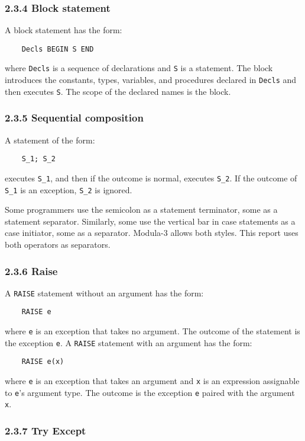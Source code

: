 \documentclass[10pt]{article}
\begin{document}
\subsubsection*{2.3.4 Block statement}

A block statement has the form:
\begin{verbatim}
    Decls BEGIN S END
\end{verbatim}
where \verb|Decls| is a sequence of declarations and \verb|S| is a statement.
The block introduces the constants, types, variables, and procedures declared
in \verb|Decls| and then executes \verb|S|.  The scope of the declared names
is the block.

\subsubsection*{2.3.5 Sequential composition}

A statement of the form:
\begin{verbatim}
    S_1; S_2
\end{verbatim}
executes \verb|S_1|, and then if the outcome is normal, executes \verb|S_2|.
If the outcome of \verb|S_1| is an exception, \verb|S_2| is ignored.

Some programmers use the semicolon as a statement terminator, some as a
statement separator.  Similarly, some use the vertical bar in case statements
as a case initiator, some as a separator.  Modula-3 allows both styles.  This
report uses both operators as separators.

\subsubsection*{2.3.6 Raise}

A \verb|RAISE| statement without an argument has the form:
\begin{verbatim}
    RAISE e
\end{verbatim}
where \verb|e| is an exception that takes no argument.  The outcome of the
statement is the exception \verb|e|.  A \verb|RAISE| statement with an
argument has the form:
\begin{verbatim}
    RAISE e(x)
\end{verbatim}
where \verb|e| is an exception that takes an argument and \verb|x| is an
expression assignable to \verb|e|'s argument type.  The outcome is the
exception \verb|e| paired with the argument \verb|x|.

\subsubsection*{2.3.7 Try Except}
\end{document}
